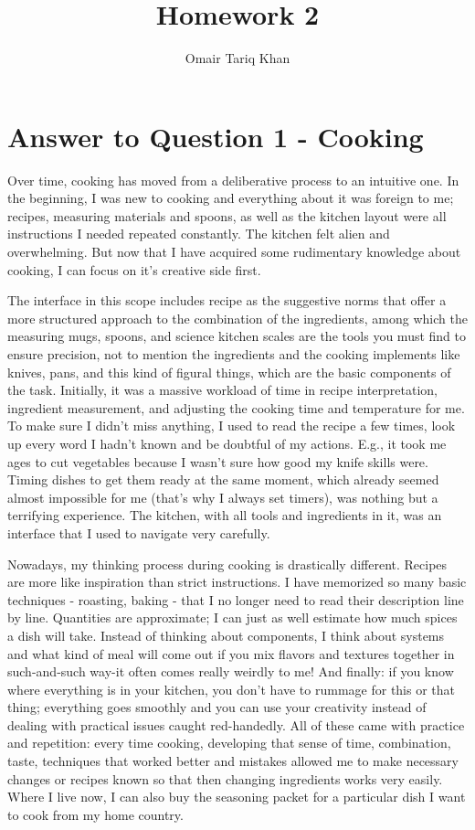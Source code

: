 \documentclass[
	letterpaper, %
]{jdf}
\author{Omair Tariq Khan}
\title{Homework 2}
\begin{document}

\maketitle
\hfill \break
\hfill \break


\section{Answer to Question 1 - Cooking}
Over time, cooking has moved from a deliberative process to an intuitive one. In the beginning, I was new to cooking and everything about it was foreign to me; recipes, measuring materials and spoons, as well as the kitchen layout were all instructions I needed repeated constantly. The kitchen felt alien and overwhelming. But now that I have acquired some rudimentary knowledge about cooking, I can focus on it’s creative side first.

The interface in this scope includes recipe as the suggestive norms that offer a more structured approach to the combination of the ingredients, among which the measuring mugs, spoons, and science kitchen scales are the tools you must find to ensure precision, not to mention the ingredients and the cooking implements like knives, pans, and this kind of figural things, which are the basic components of the task. Initially, it was a massive workload of time in recipe interpretation, ingredient measurement, and adjusting the cooking time and temperature for me. To make sure I didn't miss anything, I used to read the recipe a few times, look up every word I hadn't known and be doubtful of my actions. E.g., it took me ages to cut vegetables because I wasn't sure how good my knife skills were. Timing dishes to get them ready at the same moment, which already seemed almost impossible for me (that's why I always set timers), was nothing but a terrifying experience. The kitchen, with all tools and ingredients in it, was an interface that I used to navigate very carefully.

Nowadays, my thinking process during cooking is drastically different. Recipes are more like inspiration than strict instructions. I have memorized so many basic techniques - roasting, baking - that I no longer need to read their description line by line. Quantities are approximate; I can just as well estimate how much spices a dish will take. Instead of thinking about components, I think about systems and what kind of meal will come out if you mix flavors and textures together in such-and-such way-it often comes really weirdly to me! And finally: if you know where everything is in your kitchen, you don't have to rummage for this or that thing; everything goes smoothly and you can use your creativity instead of dealing with practical issues caught red-handedly.  All of these came with practice and repetition: every time cooking, developing that sense of time, combination, taste, techniques that worked better and mistakes allowed me to make necessary changes or recipes known so that then changing ingredients works very easily. Where I live now, I can also buy the seasoning packet for a particular dish I want to cook from my home country. 
\end{document}
